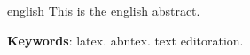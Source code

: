 \begin{resumo}[Abstract]
 \begin{otherlanguage*}{english}
    This is the english abstract.
    
    \textbf{Keywords}: latex. abntex. text editoration.
 \end{otherlanguage*}
\end{resumo}

